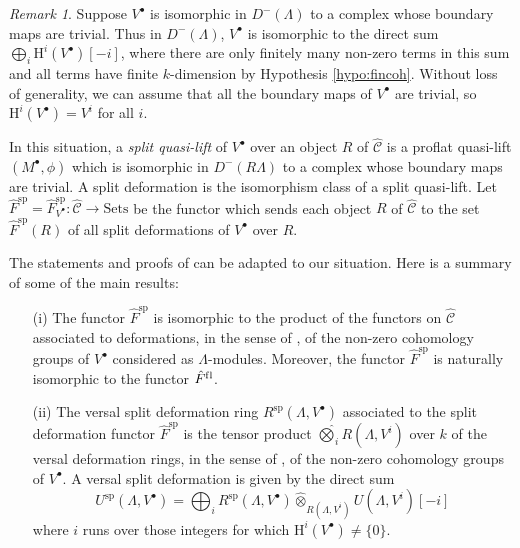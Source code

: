 \documentclass{amsart}
\theoremstyle{plain}
\theoremstyle{definition}
\theoremstyle{remark}
\newtheorem{rem}[thm]{Remark}
\begin{document}
\begin{rem}
\label{rem:split}
Suppose $V^\bullet$ is isomorphic in
$D^-(\Lambda)$ to a complex whose boundary maps are trivial.  Thus
in $D^-(\Lambda)$, $V^\bullet$ is isomorphic to the direct sum
$\bigoplus_i {\mathrm{H}}^{i}(V^\bullet)[-i]$, where there are only finitely
many non-zero terms in this sum and all terms have finite $k$-dimension by Hypothesis
\ref{hypo:fincoh}.  Without loss of generality,
we can assume that all the boundary maps of $V^\bullet$ are trivial,
so ${\mathrm{H}}^{i}(V^\bullet) = V^{i}$ for all $i$.

In this situation, a \emph{split quasi-lift}
of $V^\bullet$ over an object $R$ of
$\hat{\mathcal{C}}$ is a proflat quasi-lift $(M^\bullet,\phi)$ which is
isomorphic in $D^-(R\Lambda)$ to a complex whose boundary maps are trivial.
A split deformation is the isomorphism class of a split quasi-lift.
Let $\hat{F}^{\mathrm{sp}} = \hat{F}^{\mathrm{sp}}_{V^\bullet}:\hat{\mathcal{C}} \to \mathrm{Sets}$
be the functor which sends
each object $R$ of $\hat{\mathcal{C}}$ to the set
$\hat{F}^{\mathrm{sp}}(R)$ of all split deformations of $V^\bullet $ over $R$.

The statements and proofs of 
\cite[Lemma 11.2 and Prop. 11.3]{bcderived} can be adapted to our situation. Here 
is a summary of some of the main results:

\begin{enumerate}
\item[(i)]
The functor $\hat{F}^{\mathrm{sp}}$ is isomorphic to the product of the functors on $\hat{\mathcal {C}}$ 
associated to deformations, in the sense of \cite{blehervelez},
of the non-zero cohomology groups of $V^\bullet$ considered as $\Lambda$-modules.
Moreover, the functor $\hat{F}^{\mathrm{sp}}$  is naturally isomorphic to the functor
$\hat{F}^{\mathrm{f\/l}}$.

\item[(ii)]
The versal split deformation ring $R^{\mathrm{sp}}(\Lambda,V^\bullet)$ associated to
the split deformation functor $\hat{F}^{\mathrm{sp}}$
is the tensor product $\hat{\bigotimes}_i R(\Lambda,V^i)$ over $k$ of the versal deformation
rings, in the sense of \cite{blehervelez}, of the non-zero cohomology groups of $V^\bullet$.
A versal split deformation is given by the direct sum
$$U^{\mathrm{sp}}(\Lambda,V^\bullet) = \bigoplus_i R^{\mathrm{sp}}(\Lambda,V^\bullet)
\hat{\otimes}_{R(\Lambda,V^i)} U(\Lambda,V^i)[-i]$$
where $i$ runs over those integers for which ${\mathrm{H}}^i(V^\bullet) \ne \{0\}$.


\end{enumerate}
\end{rem}
\end{document}
